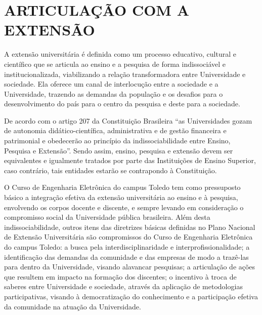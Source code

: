 




\section{ARTICULAÇÃO COM A EXTENSÃO}

A extensão universitária é definida como um processo educativo, cultural e científico que se articula ao ensino e a pesquisa de forma indissociável e institucionalizada, viabilizando a relação transformadora entre Universidade e sociedade. Ela oferece um canal de interlocução entre a sociedade e a Universidade, trazendo as demandas da população e os desafios para o desenvolvimento do país para o centro da pesquisa e deste para a sociedade.

De acordo com o artigo 207 da Constituição Brasileira ``as Universidades gozam de autonomia didático-científica, administrativa e de gestão financeira e patrimonial e obedecerão ao princípio da indissociabilidade entre Ensino, Pesquisa e Extensão''. Sendo assim, ensino, pesquisa e extensão devem ser equivalentes e igualmente tratados por parte das Instituições de Ensino Superior, caso contrário, tais entidades estarão se contrapondo à Constituição.

O Curso de Engenharia Eletrônica do campus Toledo tem como pressuposto básico a integração efetiva da extensão universitária ao ensino e à pesquisa, envolvendo os corpos docente e discente, e sempre levando em consideração o compromisso social da Universidade pública brasileira. Além desta indissociabilidade, outros itens das diretrizes básicas definidas no Plano Nacional de Extensão Universitária são compromissos do Curso de Engenharia Eletrônica do campus Toledo: a busca pela interdisciplinaridade e interprofissionalidade; a identificação das demandas da comunidade e das empresas de modo a trazê-las para dentro da Universidade, visando alavancar pesquisas; a articulação de ações que resultem em impacto na formação dos discentes; o incentivo à troca de saberes entre Universidade e sociedade, através da aplicação de metodologias participativas, visando à democratização do conhecimento e a participação efetiva da comunidade na atuação da Universidade. 

